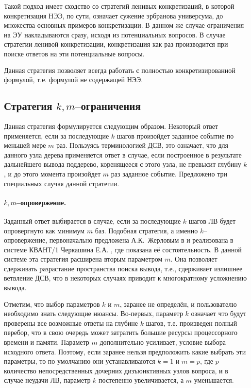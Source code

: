 Такой подход имеет сходство со стратегий ленивых конкретизаций, в которой конкретизация НЭЭ, по сути, означает сужение эрбранова универсума, до множества основных примеров конкретизации. В данном же случае ограничения на ЭУ накладываются сразу, исходя из потенциальных вопросов. В случае стратегии ленивой конкретизации, конкретизация как раз производится при поиске ответов на эти потенциальные вопросы.

Данная стратегия позволяет всегда работать с полностью конкретизированной формулой, т.е. формулой не содержащей НЭЭ.

\subsection{Стратегия $k,m$--ограничения}
Данная стратегия формулируется следующим образом. Некоторый ответ применяется, если за последующие $k$ шагов произойдет заданное событие по меньшей мере $m$ раз. Пользуясь терминологией ДСВ, это означает, что для данного узла дерева применяется ответ в случае, если построенное в результате дальнейшего вывода поддерево, коренящееся с этого узла, не превысит глубину $k$, и до этого момента произойдет $m$ раз заданное событие. Предложено три специальных случая данной стратегии.

\paragraph{$k,m$--опровержение.} Заданный ответ выбирается в случае, если за последующие $k$ шагов ЛВ будет опровергнуто как минимум $m$ баз. Подобная стратегия, а именно $k$--опровержение, первоначально предложена А.К.~Жерловым в \cite{ICDS2000} и реализована в системе КВАНТ/1 Черкашина Е.А. \cite{dissChe}, где показана её состоятельность. В данной системе эта стратегия расширена вторым параметром $m$. Она позволяет сдерживать разрастание пространства поиска вывода, т.е., сдерживает излишнее ветвление ДСВ, что в некоторых случаях приводит к многократному усложнению вывода.

Отметим, что выбор параметров $k$ и $m$, заранее не определён, и пользователю необходимо знать следующие нюансы. Во-первых, параметр $k$ означает что будут проверены все возможные ответы на глубине $k$ шагов, т.е. произведен полный перебор, что в свою очередь может затратить большие ресурсы процессорного времени и памяти. Параметр $m$ дополнительно усиливает, условие выбора исходного ответа. Поэтому, если заранее нельзя предположить какие выбрать эти параметры, то по умолчанию они устанавливаются $k=1$ и $m=p$, где $p$ количество непосредственных дочерних дизъюнктивных узлов вопроса, и в случае неудачи ЛВ, параметр $k$ постепенно увеличивается, а $m$ уменьшается.

